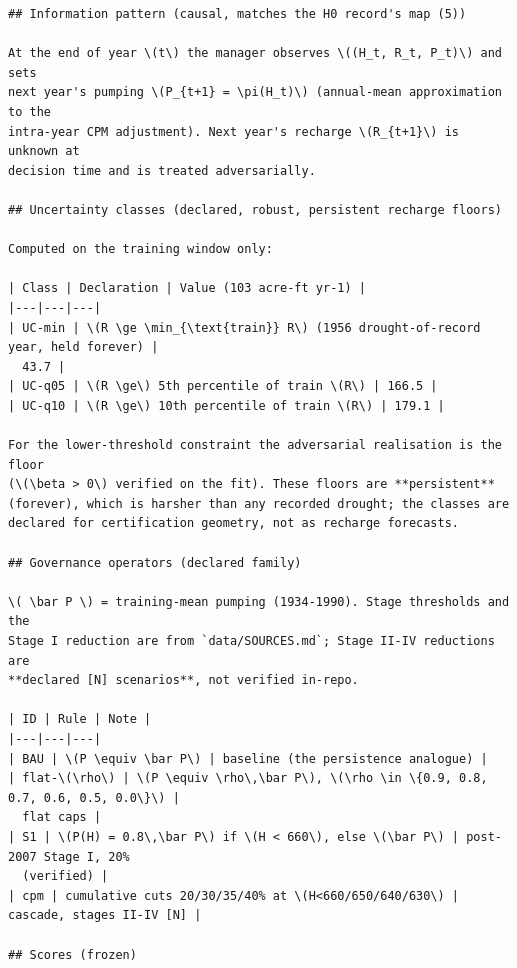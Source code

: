 \begin{footnotesize}
\begin{verbatim}
## Information pattern (causal, matches the H0 record's map (5))

At the end of year \(t\) the manager observes \((H_t, R_t, P_t)\) and sets
next year's pumping \(P_{t+1} = \pi(H_t)\) (annual-mean approximation to the
intra-year CPM adjustment). Next year's recharge \(R_{t+1}\) is unknown at
decision time and is treated adversarially.

## Uncertainty classes (declared, robust, persistent recharge floors)

Computed on the training window only:

| Class | Declaration | Value (103 acre-ft yr-1) |
|---|---|---|
| UC-min | \(R \ge \min_{\text{train}} R\) (1956 drought-of-record year, held forever) |
  43.7 |
| UC-q05 | \(R \ge\) 5th percentile of train \(R\) | 166.5 |
| UC-q10 | \(R \ge\) 10th percentile of train \(R\) | 179.1 |

For the lower-threshold constraint the adversarial realisation is the floor
(\(\beta > 0\) verified on the fit). These floors are **persistent**
(forever), which is harsher than any recorded drought; the classes are
declared for certification geometry, not as recharge forecasts.

## Governance operators (declared family)

\( \bar P \) = training-mean pumping (1934-1990). Stage thresholds and the
Stage I reduction are from `data/SOURCES.md`; Stage II-IV reductions are
**declared [N] scenarios**, not verified in-repo.

| ID | Rule | Note |
|---|---|---|
| BAU | \(P \equiv \bar P\) | baseline (the persistence analogue) |
| flat-\(\rho\) | \(P \equiv \rho\,\bar P\), \(\rho \in \{0.9, 0.8, 0.7, 0.6, 0.5, 0.0\}\) |
  flat caps |
| S1 | \(P(H) = 0.8\,\bar P\) if \(H < 660\), else \(\bar P\) | post-2007 Stage I, 20%
  (verified) |
| cpm | cumulative cuts 20/30/35/40% at \(H<660/650/640/630\) | cascade, stages II-IV [N] |

## Scores (frozen)


\end{verbatim}
\end{footnotesize}
